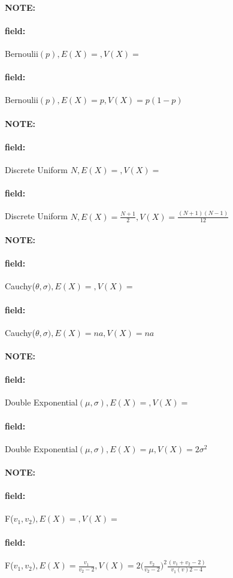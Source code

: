 \documentclass[12pt]{article}
\newenvironment{note}{\paragraph{NOTE:}}{}
\newenvironment{field}{\paragraph{field:}}{}
\begin{document}
\begin{note}
  \begin{field}
    Bernoulii$(p), E(X) = , V(X) = $
  \end{field}
  \begin{field}
     Bernoulii$(p), E(X) = p, V(X) = p(1-p)$
  \end{field}
\end{note}

\begin{note}
  \begin{field}
    Discrete Uniform $N, E(X) = , V(X) = $
  \end{field}
  \begin{field}
    Discrete Uniform $N, E(X) = \frac{N+1}{2}, V(X) = \frac{(N+1)(N-1)}{12}$
  \end{field}
\end{note}

\begin{note}
  \begin{field}
    Cauchy($\theta,\sigma), E(X) = ,V(X)=$
  \end{field}
  \begin{field}
    Cauchy($\theta,\sigma), E(X) = na,V(X)=na$
  \end{field}
\end{note}

\begin{note}
  \begin{field}
    Double Exponential$(\mu,\sigma), E(X) = , V(X) = $
  \end{field}
  \begin{field}
    Double Exponential$(\mu,\sigma), E(X) = \mu, V(X) = 2\sigma^2$
  \end{field}
\end{note}

\begin{note}
  \begin{field}
    F($v_1,v_2), E(X) = , V(X) = $
  \end{field}
  \begin{field}
F($v_1,v_2), E(X) = \frac{v_1}{v_2-2}, V(X) = 2\big(\frac{v_2}{v_2-2}\big)^2\frac{(v_1+v_2-2)}{v_1(v)2-4}$
  \end{field}
\end{note}
\end{document}
